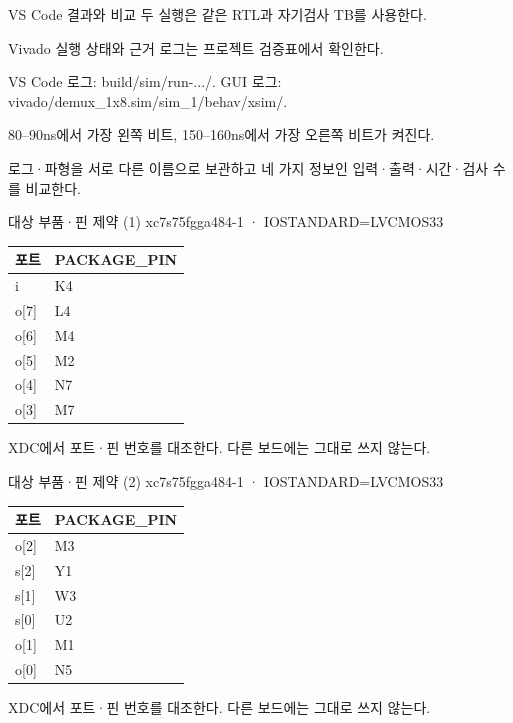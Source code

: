 \begin{frame}{VS Code 결과와 비교}\relax
\small
두 실행은 같은 RTL과 자기검사 TB를 사용한다.\par\vspace{0.22cm}Vivado 실행 상태와 근거 로그는 프로젝트 검증표에서 확인한다.\par\vspace{0.22cm}VS Code 로그: build/sim/run-.../. GUI 로그: vivado/demux\_1x8.sim/sim\_1/behav/xsim/.\par\vspace{0.22cm}80–90ns에서 가장 왼쪽 비트, 150–160ns에서 가장 오른쪽 비트가 켜진다.\par\vspace{0.22cm}로그·파형을 서로 다른 이름으로 보관하고 네 가지 정보인 입력·출력·시간·검사 수를 비교한다.\par
\end{frame}

\begin{frame}{대상 부품·핀 제약 (1)}\relax
\small
xc7s75fgga484-1 · IOSTANDARD=LVCMOS33\par\begin{center}\renewcommand{\arraystretch}{1.45}
\begin{tabular}{l|l}
포트 & PACKAGE\_PIN\\\hline
i & K4\\
o[7] & L4\\
o[6] & M4\\
o[5] & M2\\
o[4] & N7\\
o[3] & M7\\
\end{tabular}\end{center}
XDC에서 포트·핀 번호를 대조한다. 다른 보드에는 그대로 쓰지 않는다.\par
\end{frame}

\begin{frame}{대상 부품·핀 제약 (2)}\relax
\small
xc7s75fgga484-1 · IOSTANDARD=LVCMOS33\par\begin{center}\renewcommand{\arraystretch}{1.45}
\begin{tabular}{l|l}
포트 & PACKAGE\_PIN\\\hline
o[2] & M3\\
s[2] & Y1\\
s[1] & W3\\
s[0] & U2\\
o[1] & M1\\
o[0] & N5\\
\end{tabular}\end{center}
XDC에서 포트·핀 번호를 대조한다. 다른 보드에는 그대로 쓰지 않는다.\par
\end{frame}

